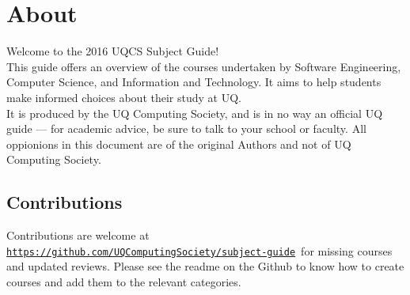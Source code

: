 \section{About}
\hypertarget{core:about}{}
Welcome to the 2016 UQCS Subject Guide!\\

\noindent
This guide offers an overview of the courses undertaken by Software Engineering, Computer Science, and Information and Technology.
It aims to help students make informed choices about their study at UQ.\\

\noindent
It is produced by the UQ Computing Society, and is in no way an official UQ guide --- for academic advice, be sure to talk to your school or faculty.
All oppionions in this document are of the original Authors and not of UQ Computing Society.

\subsection{Contributions}

Contributions are welcome at \href{https://github.com/UQComputingSociety/subject-guide}{\nolinkurl{https://github.com/UQComputingSociety/subject-guide}}\ for missing courses and updated reviews. Please see the readme
on the Github to know how to create courses and add them to the relevant categories.